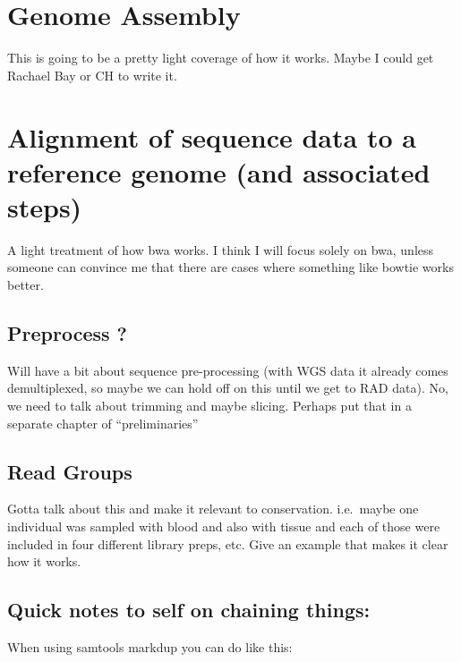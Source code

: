 \documentclass[]{krantz}
\begin{document}
\hypertarget{genome-assembly}{%
\chapter{Genome Assembly}\label{genome-assembly}}

This is going to be a pretty light coverage of how it works. Maybe I could get Rachael
Bay or CH to write it.

\hypertarget{alignment-of-sequence-data-to-a-reference-genome-and-associated-steps}{%
\chapter{Alignment of sequence data to a reference genome (and associated steps)}\label{alignment-of-sequence-data-to-a-reference-genome-and-associated-steps}}

A light treatment of how bwa works. I think I will focus solely on bwa, unless
someone can convince me that there are cases where something like bowtie works better.

\hypertarget{preprocess}{%
\section{Preprocess ?}\label{preprocess}}

Will have a bit about sequence pre-processing (with WGS data it already
comes demultiplexed, so maybe we can hold off on this until we get to
RAD data). No, we need to talk about trimming and maybe slicing. Perhaps
put that in a separate chapter of ``preliminaries''

\hypertarget{read-groups}{%
\section{Read Groups}\label{read-groups}}

Gotta talk about this and make it relevant to conservation. i.e.~maybe one individual was sampled with blood and also with tissue and each of those were included in four different library preps, etc. Give an example that makes it
clear how it works.

\hypertarget{quick-notes-to-self-on-chaining-things}{%
\section{Quick notes to self on chaining things:}\label{quick-notes-to-self-on-chaining-things}}

When using samtools markdup you can do like this:
\end{document}
